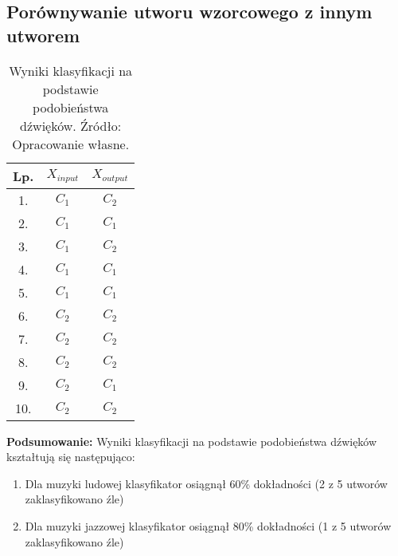\subsection{Porównywanie utworu wzorcowego z innym utworem}
\FloatBarrier
\begin{table}[h]
\centering
\begin{tabular}{|c|c|c|}
\hline
Lp. & $X_{input}$ & $X_{output}$ \\ \hline
1.   & $C_{1}$      & $C_{2}$      \\ \hline
2.   & $C_{1}$      & $C_{1}$     \\ \hline
3.   & $C_{1}$      & $C_{2}$      \\ \hline
4.   & $C_{1}$      & $C_{1}$     \\ \hline
5.   & $C_{1}$      & $C_{1}$      \\ \hline
6.   & $C_{2}$      & $C_{2}$    \\ \hline
7.   & $C_{2}$      & $C_{2}$     \\ \hline
8.   & $C_{2}$      & $C_{2}$     \\ \hline
9.   & $C_{2}$      & $C_{1}$     \\ \hline
10.  & $C_{2}$      & $C_{2}$      \\ \hline
\end{tabular}
\caption{Wyniki klasyfikacji na podstawie podobieństwa dźwięków. Źródło: Opracowanie własne.}
\end{table}
\FloatBarrier

\textbf{Podsumowanie:}
Wyniki klasyfikacji na podstawie podobieństwa dźwięków kształtują się następująco:

\begin{enumerate}
    \item Dla muzyki ludowej klasyfikator osiągnął 60\% dokładności (2 z 5 utworów zaklasyfikowano źle)
    \item Dla muzyki jazzowej klasyfikator osiągnął 80\% dokładności (1 z 5 utworów zaklasyfikowano źle)
\end{enumerate}

